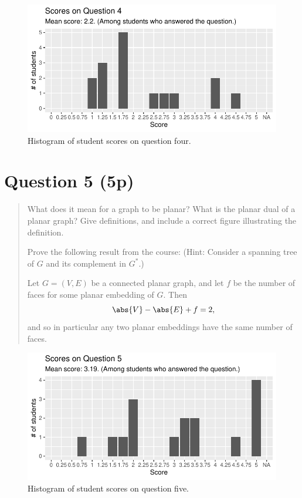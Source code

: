 \documentclass[nobib]{tufte-handout}
\begin{document}
\begin{figure}[p]
  \centering
  \includegraphics[width = \textwidth]{Q4.pdf}
  \caption[Score histogram for Q4]{Histogram of student scores on question four.}
  \label{fig:Q4}
\end{figure}

\section{Question 5 (5p)} %

\begin{quotation}
  What does it mean for a graph to be planar? What is the planar dual of a planar graph? Give definitions, and include a correct figure illustrating the definition.

  Prove the following result from the course: (Hint: Consider a spanning tree of $G$ and its complement in $G^*$.)
  \begin{theorem}
    Let $G = (V,E)$ be a connected planar graph, and let $f$ be the number of faces for some planar embedding of $G$. Then
    $$\abs{V} - \abs{E} + f = 2,$$
    and so in particular any two planar embeddings have the same number of faces.
  \end{theorem}
\end{quotation}

\begin{figure}[p]
  \centering
  \includegraphics[width = \textwidth]{Q5.pdf}
  \caption[Score histogram for Q5]{Histogram of student scores on question five.}
  \label{fig:Q5}
\end{figure}
\end{document}
